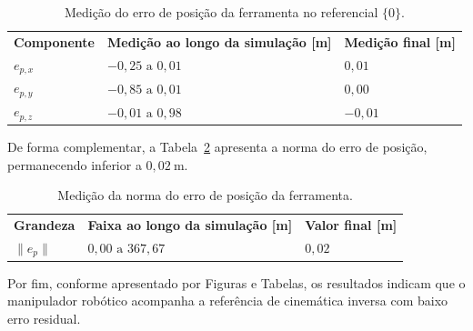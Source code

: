 \begin{table}[H]
\centering
\caption{Medição do erro de posição da ferramenta no referencial $\{0\}$.}
\label{tab:cap4_erro_pos_ferramenta}
\begin{tabularx}{\linewidth}{|
  >{\centering\arraybackslash}X|
  >{\centering\arraybackslash}X|
  >{\centering\arraybackslash}X|}
\hline
\textbf{Componente} &
\textbf{Medição ao longo da simulação [m]} &
\textbf{Medição final [m]} \\
\hhline{|=|=|=|}
$e_{p,x}$ & $-0{,}25 \text{ a } 0{,}01$ & $0{,}01$ \\
\hline
$e_{p,y}$ & $-0{,}85 \text{ a } 0{,}01$ & $0{,}00$ \\
\hline
$e_{p,z}$ & $-0{,}01 \text{ a } 0{,}98$ & $-0{,}01$ \\
\hline
\end{tabularx}
\end{table}

De forma complementar, a Tabela~\ref{tab:cap4_erro_pos_ferramenta_norma} apresenta a norma do erro de posição, permanecendo inferior a $0{,}02~\mathrm{m}$.

\begin{table}[H]
\centering
\caption{Medição da norma do erro de posição da ferramenta.}
\label{tab:cap4_erro_pos_ferramenta_norma}
\begin{tabularx}{\linewidth}{|
  >{\centering\arraybackslash}X|
  >{\centering\arraybackslash}X|
  >{\centering\arraybackslash}X|}
\hline
\textbf{Grandeza} &
\textbf{Faixa ao longo da simulação [m]} &
\textbf{Valor final [m]} \\
\hhline{|=|=|=|}
$\|e_p\|$ & $0{,}00 \text{ a } 367{,}67$ & $0{,}02$ \\
\hline
\end{tabularx}
\end{table}

Por fim, conforme apresentado por Figuras e Tabelas, os resultados indicam que o manipulador robótico acompanha a referência de cinemática inversa com baixo erro residual.